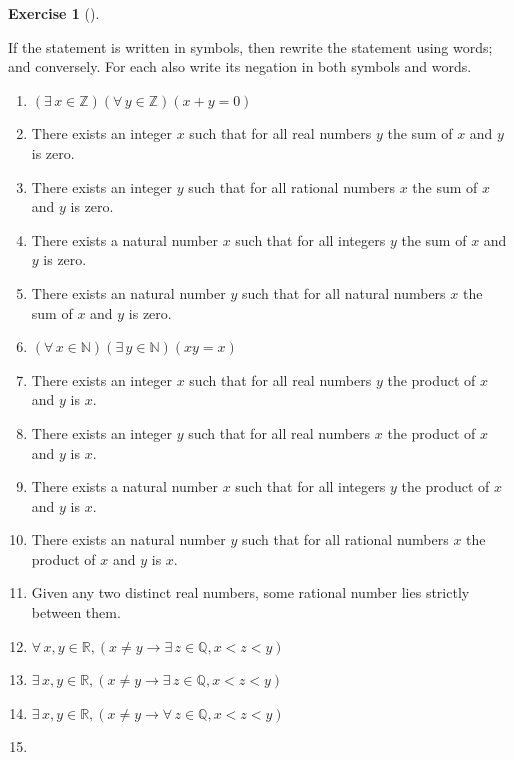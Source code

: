 \documentclass[
  letterpaper,
  10pt,
  reqno,
  twopage,
  openany]{book}
\providecommand{\tightlist}{%
  \setlength{\itemsep}{0pt}\setlength{\parskip}{0pt}}\usepackage{longtable,booktabs,array}
\theoremstyle{plain}
\theoremstyle{definition}
\newtheorem{exercise}{Exercise}[chapter]
\theoremstyle{definition}
\theoremstyle{definition}
\theoremstyle{plain}
\theoremstyle{plain}
\theoremstyle{remark}
\begin{document}
\leavevmode{}%
\begin{exercise}[]\label{exr-write-negation-in-symbols-words}

If the statement is written in symbols, then rewrite the statement using
words; and conversely. For each also write its negation in both symbols
and words.

\begin{enumerate}
\def\labelenumi{\arabic{enumi}.}
\tightlist
\item
  \((\exists \, x\in \mathbb{Z})(\forall \, y\in \mathbb{Z})(x+y=0)\)
\item
  There exists an integer \(x\) such that for all real numbers \(y\) the
  sum of \(x\) and \(y\) is zero.
\item
  There exists an integer \(y\) such that for all rational numbers \(x\)
  the sum of \(x\) and \(y\) is zero.
\item
  There exists a natural number \(x\) such that for all integers \(y\)
  the sum of \(x\) and \(y\) is zero.
\item
  There exists an natural number \(y\) such that for all natural numbers
  \(x\) the sum of \(x\) and \(y\) is zero.
\item
  \((\forall \, x\in \mathbb{N})(\exists \, y\in \mathbb{N})(x y=x)\)
\item
  There exists an integer \(x\) such that for all real numbers \(y\) the
  product of \(x\) and \(y\) is \(x\).
\item
  There exists an integer \(y\) such that for all real numbers \(x\) the
  product of \(x\) and \(y\) is \(x\).
\item
  There exists a natural number \(x\) such that for all integers \(y\)
  the product of \(x\) and \(y\) is \(x\).
\item
  There exists an natural number \(y\) such that for all rational
  numbers \(x\) the product of \(x\) and \(y\) is \(x\).
\item
  Given any two distinct real numbers, some rational number lies
  strictly between them.
\item
  \(\forall \, x,y\in \mathbb{R}, (x\neq y\rightarrow \exists \, z\in \mathbb{Q}, x<z<y)\)
\item
  \(\exists \, x,y\in \mathbb{R}, (x\neq y\rightarrow \exists \, z\in \mathbb{Q}, x<z<y)\)
\item
  \(\exists \, x,y\in \mathbb{R}, (x\neq y\rightarrow \forall \, z\in \mathbb{Q}, x<z<y)\)
\item

\end{enumerate}
\end{exercise}
\end{document}

